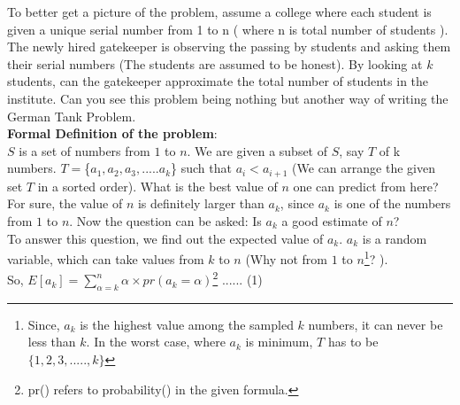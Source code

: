 \documentclass{llncs}
\begin{document}
To better get a picture of the problem, assume a college where each student is given a unique serial number from 1 to n ( where n is total number of students ). The newly hired gatekeeper is observing the passing by students and asking them their serial numbers (The students are assumed to be honest). By looking at $k$ students, can the gatekeeper approximate the total number of students in the institute. Can you see this problem being nothing but another way of writing the German Tank Problem. \\

\textbf{\large Formal Definition of the problem}:\\
$S$ is a set of numbers from $1$ to $n$. We are given a subset of $S$, say $T$ of k numbers. $T=$\{$a_1,a_2,a_3,.....a_k$\} such that $a_i<a_{i+1}$ (We can arrange the given set $T$ in a sorted order). What is the best value of $n$ one can predict from here? For sure, the value of $n$ is definitely larger than $a_k$, since $a_k$ is one of the numbers from $1$ to $n$. 
Now the question can be asked: Is $a_k$ a good estimate of $n$?\\

To answer this question, we find out the expected value of $a_k$. $a_k$ is a random variable, which can take values from $k$ to $n$ (Why not from $1$ to $n$\footnote{Since, $a_k$ is the highest value among the sampled $k$ numbers, it can never be less than $k$. In the worst case, where $a_k$ is minimum, $T$ has to be $\{1,2,3,.....,k\}$}? ). \\

So, $E[a_k] = \sum_{\alpha=k}^{n} \alpha \times pr(a_k= \alpha)$\footnote{pr() refers to probability() in the given formula.}  \hspace{3cm} ...... (1) \\
\end{document}
